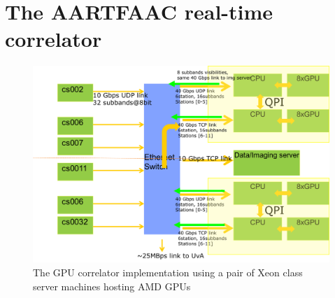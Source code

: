 \documentclass{ws-jai}
\begin{document}
\section {\label{sec:gpucorr} The AARTFAAC real-time correlator}
\begin{figure}[htbp]
\centering
\includegraphics[width=1\textwidth]{Figs/correlator_arch.png}
\caption{The GPU  correlator implementation  using a pair  of Xeon  class server
  machines hosting AMD GPUs}
\label{fig:afaac_station_hw}
\end{figure}
\end{document}
